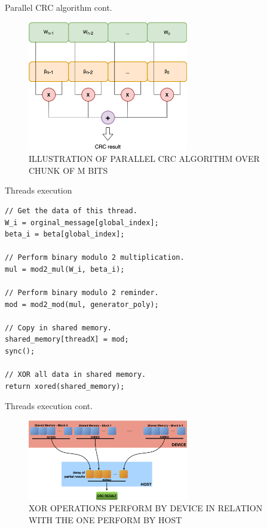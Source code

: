 \documentclass[10pt]{beamer}
\begin{document}
\begin{frame}[fragile]{Parallel CRC algorithm cont.}
\begin{figure}[bt]
\centering
\includegraphics[width=7cm]{figures/PCRC.png}
\caption{ILLUSTRATION OF  PARALLEL CRC ALGORITHM OVER CHUNK OF M BITS}
\label{fig:PCRC}
\end{figure}
\end{frame}

\begin{frame}[fragile]{Threads execution}
\begin{verbatim}
// Get the data of this thread.
W_i = orginal_message[global_index];
beta_i = beta[global_index];

// Perform binary modulo 2 multiplication.
mul = mod2_mul(W_i, beta_i);

// Perform binary modulo 2 reminder.
mod = mod2_mod(mul, generator_poly);

// Copy in shared memory.
shared_memory[threadX] = mod;
sync();

// XOR all data in shared memory.
return xored(shared_memory);
\end{verbatim}
\end{frame}

\begin{frame}[fragile]{Threads execution cont.}
\begin{figure}[bt]
\centering
\includegraphics[width=7cm]{figures/PCRC-reduction.png}
\caption{XOR OPERATIONS PERFORM BY DEVICE IN RELATION WITH THE ONE PERFORM BY HOST}
\label{fig:PCRC-reduction}
\end{figure}
\end{frame}
\end{document}
